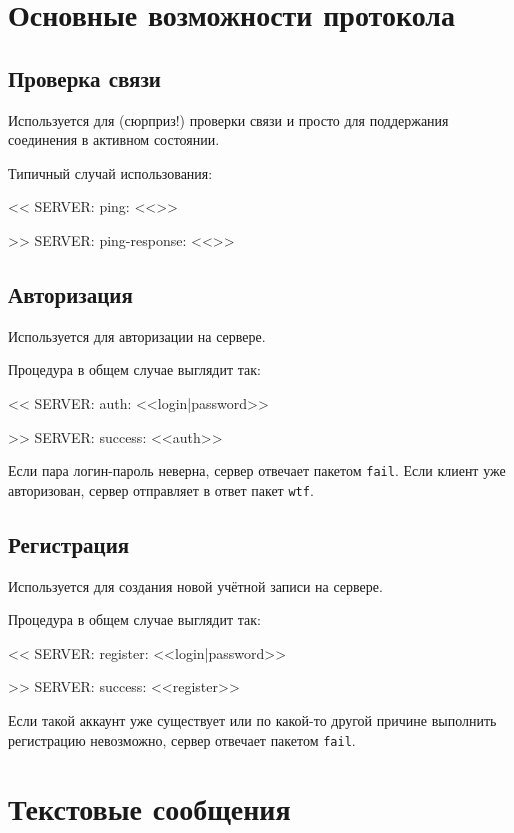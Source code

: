 \documentclass[a4paper,12pt]{book}
\begin{document}
\section{Основные возможности протокола}

\subsection{Проверка связи}
\label{ping}

Используется для (сюрприз!) проверки связи и просто для поддержания соединения в активном состоянии.

Типичный случай использования:

{\ttfamily
<{}< SERVER: ping: <<>>

>{}> SERVER: ping-response: <<>>
}

\subsection{Авторизация}
\label{auth}

Используется для авторизации на сервере.

Процедура в общем случае выглядит так:

{\ttfamily
<{}< SERVER: auth: <<login|password>>

>{}> SERVER: success: <<auth>>
}

Если пара логин-пароль неверна, сервер отвечает пакетом \texttt{fail}. Если клиент уже авторизован, сервер отправляет в ответ пакет \texttt{wtf}.

\subsection{Регистрация}
\label{register}

Используется для создания новой учётной записи на сервере.

Процедура в общем случае выглядит так:

{\ttfamily
<{}< SERVER: register: <<login|password>>

>{}> SERVER: success: <<register>>
}

Если такой аккаунт уже существует или по какой-то другой причине выполнить регистрацию невозможно, сервер отвечает пакетом \texttt{fail}.

\section{Текстовые сообщения}
\end{document}
